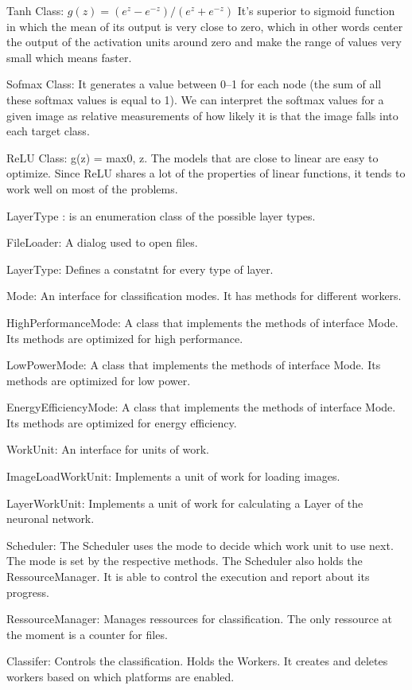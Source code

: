 \documentclass[parskip=full]{scrartcl}
\begin{document}
Tanh Class: $g(z) = (e^z -e^{-z}) / (e^z + e^{-z})$ It’s superior to sigmoid function in which the mean of its output is very close to zero, which in other words center the output of the activation units around zero and make the range of values very small which means faster.

Sofmax Class: It generates a value between 0–1 for each node (the sum of all these softmax values is equal to 1). We can interpret the softmax values for a given image as relative measurements of how likely it is that the image falls into each target class.

ReLU Class:  g(z) = max{0, z}. The models that are close to linear are easy to optimize. Since ReLU shares a lot of the properties of linear functions, it tends to work well on most of the problems.

LayerType : is an enumeration class of the possible layer types.




FileLoader: A dialog used to open files.

LayerType: Defines a constatnt for every type of layer.

Mode: An interface for classification modes. It has methods for different workers.

HighPerformanceMode: A class that implements the methods of interface Mode. Its methods are optimized for high performance.

LowPowerMode: A class that implements the methods of interface Mode. Its methods are optimized for low power.

EnergyEfficiencyMode: A class that implements the methods of interface Mode. Its methods are optimized for energy efficiency.

WorkUnit: An interface for units of work.

ImageLoadWorkUnit: Implements a unit of work for loading images.

LayerWorkUnit: Implements a unit of work for calculating a Layer of the neuronal network.

Scheduler: The Scheduler uses the mode to decide which work unit to use next. The mode is set by the respective methods. The Scheduler also holds the RessourceManager. It is able to control the execution and report about its progress.

RessourceManager: Manages ressources for classification. The only ressource at the moment is a counter for files.

Classifer: Controls the classification. Holds the Workers. It creates and deletes workers based on which platforms are enabled.
\end{document}
